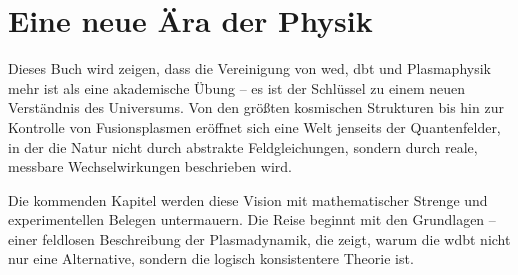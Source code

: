 \section{Eine neue Ära der Physik}
Dieses Buch wird zeigen, dass die Vereinigung von \gls{wed}, \gls{dbt} und Plasmaphysik mehr ist als eine akademische Übung – es ist der Schlüssel zu
einem neuen Verständnis des Universums. Von den größten kosmischen Strukturen bis hin zur Kontrolle von Fusionsplasmen eröffnet sich eine Welt jenseits der Quantenfelder, in der
die Natur nicht durch abstrakte Feldgleichungen, sondern durch reale, messbare Wechselwirkungen beschrieben wird.

Die kommenden Kapitel werden diese Vision mit mathematischer Strenge und experimentellen Belegen untermauern. Die Reise beginnt mit den Grundlagen – einer feldlosen Beschreibung
der Plasmadynamik, die zeigt, warum die \gls{wdbt} nicht nur eine Alternative, sondern die logisch konsistentere Theorie ist.
